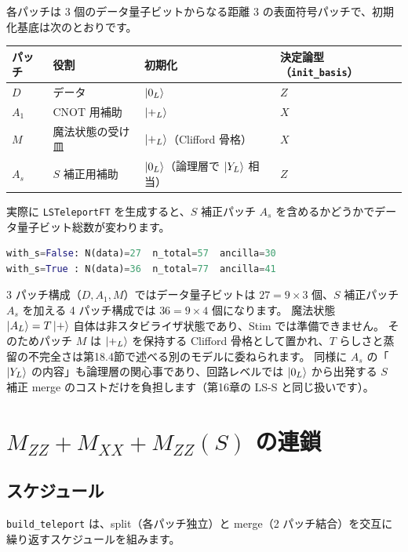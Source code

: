 各パッチは 3 個のデータ量子ビットからなる距離 3 の表面符号パッチで、初期化基底は次のとおりです。

\begin{center}
\begin{tabular}{llll}
\hline
パッチ & 役割 & 初期化 & 決定論型（\texttt{init\_basis}） \\
\hline
$D$   & データ & $\ket{0_L}$ & $Z$ \\
$A_1$ & CNOT 用補助 & $\ket{+_L}$ & $X$ \\
$M$   & 魔法状態の受け皿 & $\ket{+_L}$（Clifford 骨格） & $X$ \\
$A_s$ & $S$ 補正用補助 & $\ket{0_L}$（論理層で $\ket{Y_L}$ 相当） & $Z$ \\
\hline
\end{tabular}
\end{center}

実際に \texttt{LSTeleportFT} を生成すると、$S$ 補正パッチ $A_s$ を含めるかどうかでデータ量子ビット総数が変わります。

\begin{lstlisting}[language=Python, caption={パッチ数によるデータ量子ビット数の違い（実行結果）}]
with_s=False: N(data)=27  n_total=57  ancilla=30
with_s=True : N(data)=36  n_total=77  ancilla=41
\end{lstlisting}

3 パッチ構成（$D,A_1,M$）ではデータ量子ビットは $27=9\times3$ 個、$S$ 補正パッチ $A_s$ を加える 4 パッチ構成では $36=9\times4$ 個になります。
魔法状態 $\ket{A_L}=T\ket{+}$ 自体は非スタビライザ状態であり、Stim では準備できません。
そのためパッチ $M$ は $\ket{+_L}$ を保持する Clifford 骨格として置かれ、$T$ らしさと蒸留の不完全さは第18.4節で述べる別のモデルに委ねられます。
同様に $A_s$ の「$\ket{Y_L}$ の内容」も論理層の関心事であり、回路レベルでは $\ket{0_L}$ から出発する $S$ 補正 merge のコストだけを負担します（第16章の LS-S と同じ扱いです）。

\section{\texorpdfstring{$M_{ZZ}+M_{XX}+M_{ZZ}(S)$}{M\_ZZ + M\_XX + M\_ZZ(S)} の連鎖}\label{sec:chain}

\subsection{スケジュール}

\texttt{build\_teleport} は、split（各パッチ独立）と merge（2 パッチ結合）を交互に繰り返すスケジュールを組みます。


